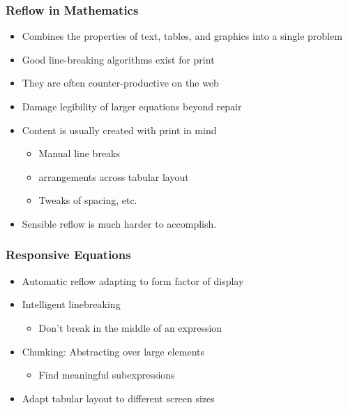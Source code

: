 \documentclass{beamer}
\begin{document}
\begin{frame}
  \frametitle{Reflow in Mathematics}
  \begin{itemize}
  \item Combines the properties of text, tables, and graphics into a single problem
  \item Good line-breaking algorithms exist for print
  \item They are often counter-productive on the web
  \item Damage legibility of larger equations beyond repair
  \item Content is usually created with print in mind
    \begin{itemize}
    \item Manual line breaks
    \item arrangements across tabular layout
    \item Tweaks of spacing, etc.
    \end{itemize}
  \item Sensible reflow is much harder to accomplish.
  \end{itemize}
\end{frame}

\begin{frame}
  \frametitle{Responsive Equations}
  \begin{itemize}
  \item Automatic reflow adapting to form factor of display
  \item Intelligent linebreaking
    \begin{itemize}
    \item Don't break in the middle of an expression
    \end{itemize}
  \item Chunking: Abstracting over large elements
    \begin{itemize}
    \item Find meaningful subexpressions
    \end{itemize}
  \item Adapt tabular layout to different screen sizes
  \end{itemize}
\end{frame}
\end{document}

